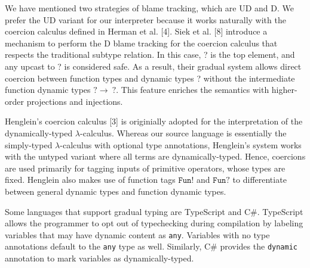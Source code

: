 We have mentioned two 
strategies of blame tracking, which are UD and D. We 
prefer the UD variant for our interpreter because it works 
naturally with the coercion calculus defined in Herman et al. [4]. 
Siek et al. [8] introduce a mechanism to perform the D blame 
tracking for the coercion calculus that respects the traditional 
subtype relation. In this case, ? 
is the top element, and any upcast to ? is considered safe. 
As a result, their gradual system allows direct 
coercion between function types and dynamic types ? without the 
intermediate function dynamic types $? \rightarrow \: ?$. This feature 
enriches the semantics with higher-order projections and 
injections.

Henglein's coercion calculus [3] is originially adopted for the 
interpretation of the dynamically-typed $\lambda$-calculus. 
Whereas our source language is essentially the 
simply-typed $\lambda$-calculus with optional type annotations, 
Henglein's system works with the untyped variant where 
all terms are dynamically-typed. Hence, coercions are used 
primarily for tagging inputs of primitive operators, whose 
types are fixed. Henglein also makes use of function tags 
$\texttt{Fun}!$ and $\texttt{Fun}?$ to differentiate between 
general dynamic types and function dynamic types.

Some languages that support gradual typing are TypeScript and 
C\#. TypeScript allows the programmer to opt out of typechecking 
during compilation by labeling variables that may have dynamic 
content as \texttt{any}. Variables with no type annotations 
default to the \texttt{any} type as well. Similarly, C\# provides
the \texttt{dynamic} annotation to mark variables as dynamically-typed. 


